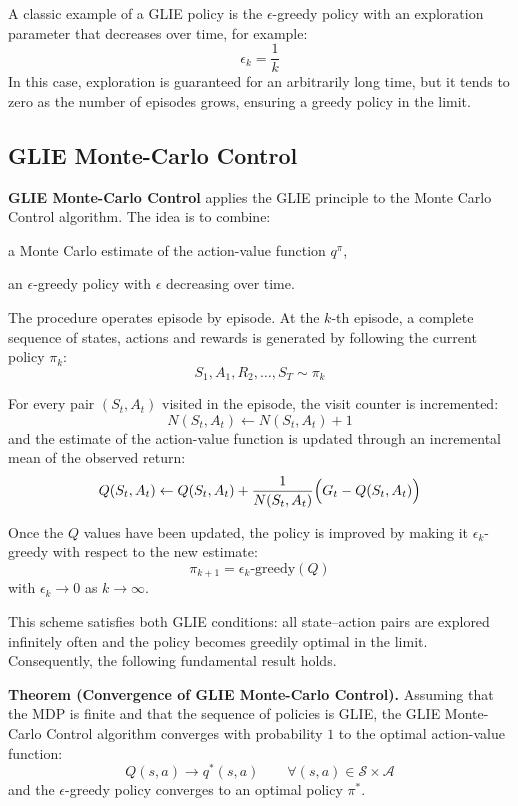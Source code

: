 A classic example of a GLIE policy is the $\epsilon$-greedy policy with an exploration parameter that decreases over time, for example:
\[
\epsilon_k = \frac{1}{k}
\]
In this case, exploration is guaranteed for an arbitrarily long time, but it tends to zero as the number of episodes grows, ensuring a greedy policy in the limit.


\subsection{GLIE Monte-Carlo Control}

\textbf{GLIE Monte-Carlo Control} applies the GLIE principle to the Monte Carlo Control algorithm. The idea is to combine:
\begin{compactitemize}
    \item a Monte Carlo estimate of the action-value function $q^\pi$,
    \item an $\epsilon$-greedy policy with $\epsilon$ decreasing over time.
\end{compactitemize}

The procedure operates episode by episode. At the $k$-th episode, a complete sequence of states, actions and rewards is generated by following the current policy $\pi_k$:
\[
S_1, A_1, R_2, \dots, S_T \sim \pi_k
\]

For every pair $(S_t, A_t)$ visited in the episode, the visit counter is incremented:
\[
N(S_t, A_t) \leftarrow N(S_t, A_t) + 1
\]
and the estimate of the action-value function is updated through an incremental mean of the observed return:
\[
Q(S_t, A_t)
\leftarrow
Q(S_t, A_t)
+
\frac{1}{N(S_t, A_t)}
\Bigl(
G_t - Q(S_t, A_t)
\Bigr)
\]

Once the $Q$ values have been updated, the policy is improved by making it $\epsilon_k$-greedy with respect to the new estimate:
\[
\pi_{k+1} = \epsilon_k\text{-greedy}(Q)
\]
with $\epsilon_k \to 0$ as $k \to \infty$.

This scheme satisfies both GLIE conditions: all state–action pairs are explored infinitely often and the policy becomes greedily optimal in the limit. Consequently, the following fundamental result holds.

\medskip

\textbf{Theorem (Convergence of GLIE Monte-Carlo Control).}
Assuming that the MDP is finite and that the sequence of policies is GLIE, the GLIE Monte-Carlo Control algorithm converges with probability $1$ to the optimal action-value function:
\[
Q(s,a) \longrightarrow q^*(s,a)
\qquad \forall (s,a) \in \mathcal{S} \times \mathcal{A}
\]
and the $\epsilon$-greedy policy converges to an optimal policy $\pi^*$.

